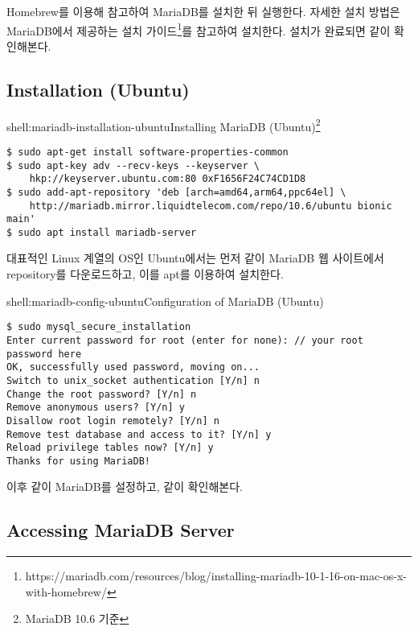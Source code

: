Homebrew를 이용해 \를 참고하여 MariaDB를 설치한 뒤 실행한다. 자세한 설치 방법은 MariaDB에서 제공하는 설치 가이드\footnote{https://mariadb.com/resources/blog/installing-mariadb-10-1-16-on-mac-os-x-with-homebrew/}를 참고하여 설치한다. 설치가 완료되면 \와 같이 확인해본다.

\subsection*{Installation (Ubuntu)}

\begin{shellenv}{shell:mariadb-installation-ubuntu}{Installing MariaDB (Ubuntu)\footnote{MariaDB 10.6 기준}}\begin{verbatim}
$ sudo apt-get install software-properties-common
$ sudo apt-key adv --recv-keys --keyserver \
    hkp://keyserver.ubuntu.com:80 0xF1656F24C74CD1D8
$ sudo add-apt-repository 'deb [arch=amd64,arm64,ppc64el] \
    http://mariadb.mirror.liquidtelecom.com/repo/10.6/ubuntu bionic main'
$ sudo apt install mariadb-server
\end{verbatim}
\end{shellenv}

대표적인 Linux 계열의 OS인 Ubuntu에서는 먼저 \와 같이 MariaDB 웹 사이트에서 repository를 다운로드하고, 이를 apt를 이용하여 설치한다.

\begin{shellenv}{shell:mariadb-config-ubuntu}{Configuration of MariaDB (Ubuntu)}\begin{verbatim}
$ sudo mysql_secure_installation
Enter current password for root (enter for none): // your root password here
OK, successfully used password, moving on...
Switch to unix_socket authentication [Y/n] n
Change the root password? [Y/n] n
Remove anonymous users? [Y/n] y
Disallow root login remotely? [Y/n] n
Remove test database and access to it? [Y/n] y
Reload privilege tables now? [Y/n] y
Thanks for using MariaDB!
\end{verbatim}
\end{shellenv}

이후 \와 같이 MariaDB를 설정하고, \와 같이 확인해본다.

\subsection*{Accessing MariaDB Server}

